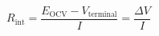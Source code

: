 \documentclass[preview]{standalone}
\begin{document}
\[R_\text{int} = \frac{E_\text{OCV} - V_\text{terminal}}{I} = \frac{\Delta V}{I} \tag{3.12}\]
\end{document}
